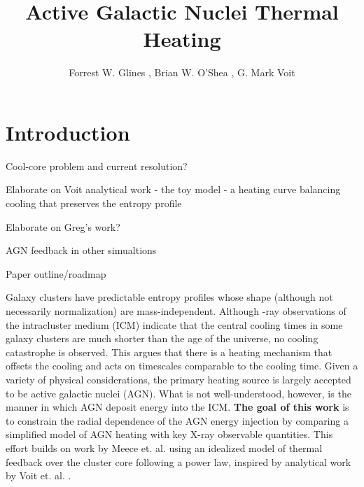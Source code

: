\documentclass[iop,apjl, twocolappendix]{emulateapj}   %
\begin{document}
\title{Active Galactic Nuclei Thermal Heating}

\author{
  Forrest W. Glines , Brian W. O'Shea , G. Mark Voit
}


\label{firstpage}

\begin{abstract}
\end{abstract}

\keywords{}

\section{Introduction}
\label{sec:introduction}


\textbullet Cool-core problem and current resolution?

\textbullet Elaborate on Voit analytical work - the toy model - a heating curve balancing
cooling that preserves the entropy profile

\textbullet Elaborate on Greg's work?

\textbullet AGN feedback in other simualtions

\textbullet Paper outline/roadmap

Galaxy clusters have predictable entropy profiles whose shape (although not
necessarily normalization) are mass-independent.
\cite{cavagnolo_intracluster_2009} Although -ray observations of the
intracluster medium (ICM) indicate that the central cooling times  in some
galaxy clusters are much shorter than the age of the universe, no cooling
catastrophe is observed. This argues that there is a heating mechanism that
offsets the cooling and acts on timescales comparable to the cooling time.
Given a variety of physical considerations, the primary heating source is
largely accepted to be active galactic nuclei (AGN).  What is not
well-understood, however, is the manner in which AGN deposit energy into the
ICM.   \textbf{The goal of this work} is to constrain the radial dependence of
the AGN energy injection by comparing a simplified model of AGN heating with
key X-ray observable quantities. This effort builds on work by Meece et. al.
\cite{meece_jr_agn_2016,meece_triggering_2017} using an idealized model of
thermal feedback over the cluster core following a power law, inspired by
analytical work by Voit et. al.
\cite{voit_global_2017}.
\end{document}
